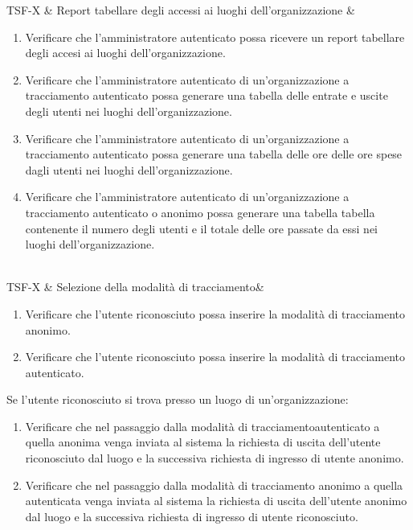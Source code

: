 TSF-X & Report tabellare degli accessi ai luoghi dell'organizzazione  & \begin{enumerate}
\item Verificare che l'amministratore autenticato possa ricevere un report tabellare degli accesi ai luoghi dell'organizzazione.
\item Verificare che l'amministratore autenticato di un'organizzazione a tracciamento autenticato possa generare una tabella delle entrate e uscite degli utenti nei luoghi dell'organizzazione.
\item Verificare che l'amministratore autenticato di un'organizzazione a tracciamento autenticato possa generare una tabella delle ore delle ore spese dagli utenti nei luoghi dell'organizzazione.
\item Verificare che l'amministratore autenticato di un'organizzazione a tracciamento autenticato o anonimo possa generare una tabella tabella contenente il numero degli utenti e il totale delle ore passate da essi nei luoghi dell’organizzazione. 
\end{enumerate} \\


TSF-X & Selezione della modalità di tracciamento& \begin{enumerate}
    \item Verificare che l'utente riconosciuto possa inserire la modalità di tracciamento anonimo.
    \item Verificare che l'utente riconosciuto possa inserire la modalità di tracciamento autenticato.
\end{enumerate}
Se l'utente riconosciuto si trova presso un luogo di un'organizzazione:
\begin{enumerate}
    \item Verificare che nel passaggio dalla modalità di tracciamentoautenticato a quella anonima venga inviata al sistema la richiesta di uscita dell'utente riconosciuto dal luogo e la successiva richiesta di ingresso di utente anonimo.
    \item Verificare che nel passaggio dalla modalità di tracciamento anonimo a quella autenticata venga inviata al sistema la richiesta di uscita dell'utente anonimo dal luogo e la successiva richiesta di ingresso di utente riconosciuto.
\end{enumerate} \\

